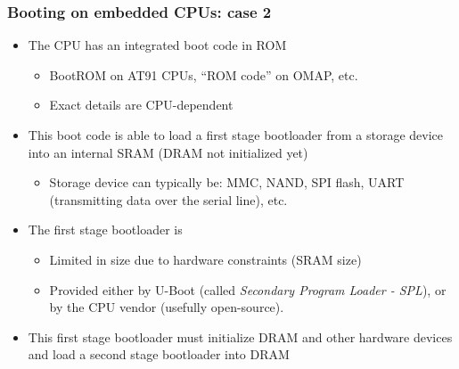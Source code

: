 \begin{frame}
  \frametitle{Booting on embedded CPUs: case 2}
  \begin{itemize}
  \item The CPU has an integrated boot code in ROM
    \begin{itemize}
    \item BootROM on AT91 CPUs, “ROM code” on OMAP, etc.
    \item Exact details are CPU-dependent
    \end{itemize}
  \item This boot code is able to load a first stage bootloader from a
    storage device into an internal SRAM (DRAM not initialized yet)
    \begin{itemize}
    \item Storage device can typically be: MMC, NAND, SPI flash, UART
          (transmitting data over the serial line), etc.
    \end{itemize}
  \item The first stage bootloader is
    \begin{itemize}
    \item Limited in size due to hardware constraints (SRAM size)
    \item Provided either by U-Boot (called {\em Secondary Program Loader
          - SPL}), or by the CPU vendor (usefully open-source).
    \end{itemize}
  \item This first stage bootloader must initialize DRAM and other
    hardware devices and load a second stage bootloader into DRAM
  \end{itemize}
\end{frame}

